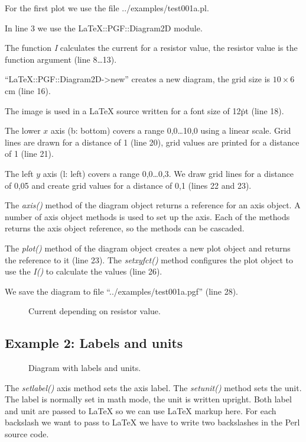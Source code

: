 \documentclass[origlongtable]{scrartcl}
\newcommand{\includepgfimage}[2]{%
\begin{figure}%
{\centering%
\caption{#2}\label{fig:#1}%
}%
\end{figure}%
}
\begin{document}
\clearpage

For the first plot we use the file ../examples/test001a.pl.

In line 3 we use the LaTeX::PGF::Diagram2D module.

The function \textit{I} calculates the current for a resistor value,
the resistor value is the function argument (line 8\ldots{}13).

``LaTeX::PGF::Diagram2D->new'' creates a new diagram, the grid size
is \(10\times{}6\)\,cm (line 16).

The image is used in a \LaTeX{} source written for a font size of
12\.pt (line 18).

The lower \(x\) axis (b: bottom) covers a range 0,0\ldots{}10,0
using a linear scale. Grid lines are drawn for a distance of 1 (line 20),
grid values are printed for a distance of 1 (line 21).

The left \(y\) axis (l: left) covers a range 0,0\ldots{}0,3.
We draw grid lines for a distance of 0,05 and create grid values
for a distance of 0,1 (lines 22 and 23).

The \textit{axis()\/} method of the diagram object returns a reference
for an axis object. A number of axis object methods is used to
set up the axis. Each of the methods returns the axis object reference,
so the methods can be cascaded.

The \textit{plot()\/} method of the diagram object creates a new
plot object and returns the reference to it (line 23).
The \textit{set\textunderscore{}xy\textunderscore{}fct()\/} method
configures the plot object to use the \textit{I()\/} to calculate
the values (line 26).

We save the diagram to file ``../examples/test001a.pgf'' (line 28).

\includepgfimage{../examples/test001a}{Current depending on resistor value.}
\clearpage
\subsection[Labels]{Example 2: Labels and units}

\includepgfimage{../examples/test002a}{Diagram with labels and units.}
The \textit{set\textunderscore{}label()\/} axis method sets the
axis label.
The \textit{set\textunderscore{}unit()\/} method sets the unit.
The label is normally set in math mode, the unit is written upright.
Both label and unit are passed to \LaTeX{} so we can use \LaTeX{}
markup here. For each backslash we want to pass to \LaTeX{} we have
to write two backslashes in the Perl source code.
\end{document}
